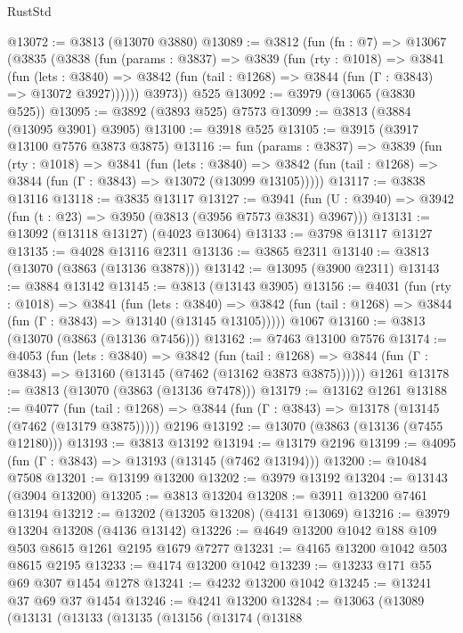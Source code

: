 \begin{lexlean}{RustStd}
\begin{coremodule}
{\begin{coremodule}
{{{{{{{{{{{{{{{{{{{{{{{{{{{{{{{{{{{@13072 := @3813 (@13070 @3880)
@13089 := @3812
    (fun (fn : @7) =>
    @13067
      (@3835
        (@3838
          (fun (params : @3837) =>
          @3839
            (fun (rty : @1018) =>
            @3841
              (fun (lets : @3840) =>
              @3842 (fun (tail : @1268) => @3844 (fun (Γ : @3843) => @13072 @3927))))))
        @3973))
    @525
@13092 := @3979 (@13065 (@3830 @525))
@13095 := @3892 (@3893 @525) @7573
@13099 := @3813 (@3884 (@13095 @3901) @3905)
@13100 := @3918 @525
@13105 := @3915 (@3917 @13100 @7576 @3873 @3875)
@13116 := fun (params : @3837) =>
  @3839
    (fun (rty : @1018) =>
    @3841
      (fun (lets : @3840) =>
      @3842 (fun (tail : @1268) => @3844 (fun (Γ : @3843) => @13072 (@13099 @13105)))))
@13117 := @3838 @13116
@13118 := @3835 @13117
@13127 := @3941
    (fun (U : @3940) => @3942 (fun (t : @23) => @3950 (@3813 (@3956 @7573 @3831) @3967)))
@13131 := @13092 (@13118 @13127) (@4023 @13064)
@13133 := @3798 @13117 @13127
@13135 := @4028 @13116 @2311
@13136 := @3865 @2311
@13140 := @3813 (@13070 (@3863 (@13136 @3878)))
@13142 := @13095 (@3900 @2311)
@13143 := @3884 @13142
@13145 := @3813 (@13143 @3905)
@13156 := @4031
    (fun (rty : @1018) =>
    @3841
      (fun (lets : @3840) =>
      @3842 (fun (tail : @1268) => @3844 (fun (Γ : @3843) => @13140 (@13145 @13105)))))
    @1067
@13160 := @3813 (@13070 (@3863 (@13136 @7456)))
@13162 := @7463 @13100 @7576
@13174 := @4053
    (fun (lets : @3840) =>
    @3842
      (fun (tail : @1268) =>
      @3844 (fun (Γ : @3843) => @13160 (@13145 (@7462 (@13162 @3873 @3875))))))
    @1261
@13178 := @3813 (@13070 (@3863 (@13136 @7478)))
@13179 := @13162 @1261
@13188 := @4077
    (fun (tail : @1268) => @3844 (fun (Γ : @3843) => @13178 (@13145 (@7462 (@13179 @3875)))))
    @2196
@13192 := @13070 (@3863 (@13136 (@7455 @12180)))
@13193 := @3813 @13192
@13194 := @13179 @2196
@13199 := @4095 (fun (Γ : @3843) => @13193 (@13145 (@7462 @13194)))
@13200 := @10484 @7508
@13201 := @13199 @13200
@13202 := @3979 @13192
@13204 := @13143 (@3904 @13200)
@13205 := @3813 @13204
@13208 := @3911 @13200 @7461 @13194
@13212 := @13202 (@13205 @13208) (@4131 @13069)
@13216 := @3979 @13204 @13208 (@4136 @13142)
@13226 := @4649 @13200 @1042 @188 @109 @503 @8615 @1261 @2195 @1679 @7277
@13231 := @4165 @13200 @1042 @503 @8615 @2195
@13233 := @4174 @13200 @1042
@13239 := @13233 @171 @55 @69 @307 @1454 @1278
@13241 := @4232 @13200 @1042
@13245 := @13241 @37 @69 @37 @1454
@13246 := @4241 @13200
@13284 := @13063
    (@13089
      (@13131
        (@13133
          (@13135
            (@13156
              (@13174
                (@13188
}}}}}}}}}}}}}}}}}}}}}}}}}}}}}}}}}}}
\end{coremodule}}
\end{coremodule}
\end{lexlean}
